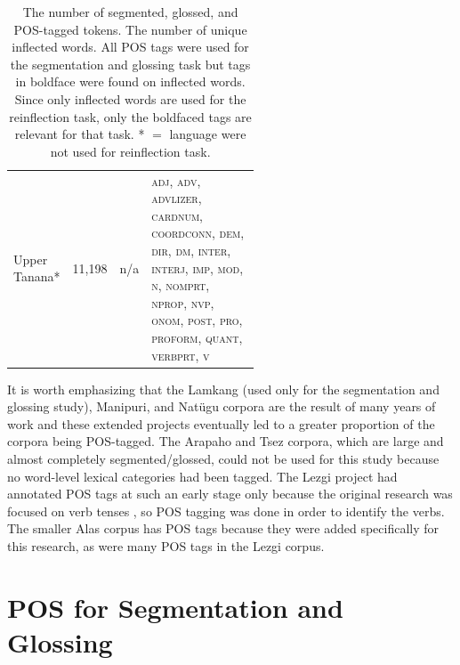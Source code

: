 \begin{table}[h!tb]
\begin{tabular}{l|c|c|p{0.55\linewidth}}
         \hline
         Upper Tanana* & 11,198 & n/a & \textsc{adj, adv, advlizer, cardnum, coordconn, dem, dir, dm, inter, interj, imp, mod, n, nomprt, nprop, nvp, onom, post, pro, proform, quant, verbprt, v} \\
    \end{tabular}
    \caption[IGT POS Tags]{The number of segmented, glossed, and POS-tagged tokens. The number of unique inflected words. All POS tags were used for the segmentation and glossing task but tags in boldface were found on inflected words. Since only inflected words are used for the reinflection task, only the boldfaced tags are relevant for that task. * $=$ language were not used for reinflection task.}
    \label{tab:IGTPOSdata}
\end{table}


It is worth emphasizing that the Lamkang (used only for the segmentation and glossing study), Manipuri, and Nat\"ugu corpora are the result of many years of work and these extended projects eventually led to a greater proportion of the corpora being POS-tagged. The Arapaho and Tsez corpora, which are large and almost completely segmented/glossed, could not be used for this study because no word-level lexical categories had been tagged. The Lezgi project had annotated POS tags at such an early stage only because the original research was focused on verb tenses \citep{donet_importance_2014}, so POS tagging was done in order to identify the verbs. The smaller Alas corpus has POS tags because they were added specifically for this research, as were many POS tags in the Lezgi corpus.




\section{POS for Segmentation and Glossing}
\label{sec:posseggls}

